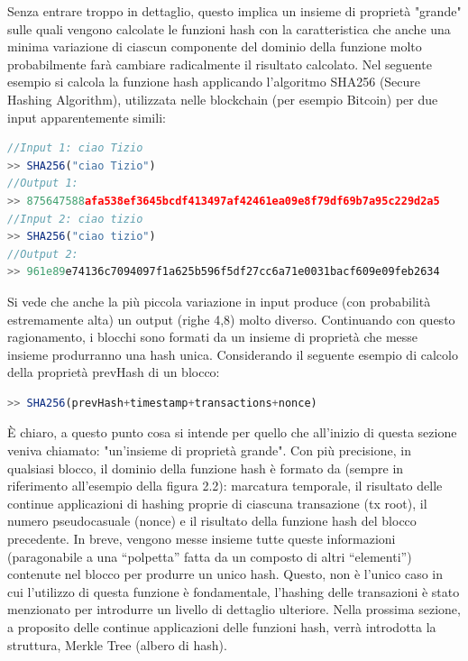 Senza entrare troppo in dettaglio, questo implica un insieme di proprietà "grande" sulle quali vengono calcolate le funzioni hash con la caratteristica che anche una minima variazione di ciascun componente del dominio della funzione molto probabilmente farà cambiare radicalmente il risultato calcolato.
Nel seguente esempio si calcola la funzione hash applicando l'algoritmo SHA256 (Secure Hashing Algorithm), utilizzata nelle blockchain (per esempio Bitcoin) per due input apparentemente simili: 

\begin{lstlisting}[caption={Esempio di calcolo della funzione hash SHA256},language=JavaScript]
//Input 1: ciao Tizio
>> SHA256("ciao Tizio")
//Output 1: 
>> 875647588afa538ef3645bcdf413497af42461ea09e8f79df69b7a95c229d2a5
//Input 2: ciao tizio
>> SHA256("ciao tizio")
//Output 2: 
>> 961e89e74136c7094097f1a625b596f5df27cc6a71e0031bacf609e09feb2634
\end{lstlisting}

Si vede che anche la più piccola variazione in input produce (con probabilità estremamente alta) un output (righe 4,8) molto diverso.
Continuando con questo ragionamento, i blocchi sono formati da un insieme di proprietà che messe insieme produrranno una hash unica. Considerando il seguente esempio di calcolo della proprietà prevHash di un blocco:

\begin{lstlisting}[caption={Esempio di calcolo della funzione hash in base alle proprietà del blocco},language=JavaScript]
>> SHA256(prevHash+timestamp+transactions+nonce)
\end{lstlisting}

È chiaro, a questo punto cosa si intende per quello che all'inizio di questa sezione veniva chiamato: "un'insieme di proprietà grande". Con più precisione, in qualsiasi blocco, il dominio della funzione hash è formato da (sempre in riferimento all'esempio della figura 2.2): marcatura temporale, il risultato delle continue applicazioni di hashing proprie di ciascuna transazione (tx root), il numero pseudocasuale (nonce) e il risultato della funzione hash del blocco precedente. In breve, vengono messe insieme tutte queste informazioni (paragonabile a una “polpetta” fatta da un composto di altri “elementi”) contenute nel blocco per produrre un unico hash. Questo, non è l'unico caso in cui l'utilizzo di questa funzione è fondamentale, l'hashing delle transazioni è stato menzionato per introdurre un livello di dettaglio ulteriore. Nella prossima sezione, a proposito delle continue applicazioni delle funzioni hash, verrà introdotta la struttura, Merkle Tree (albero di hash). 

